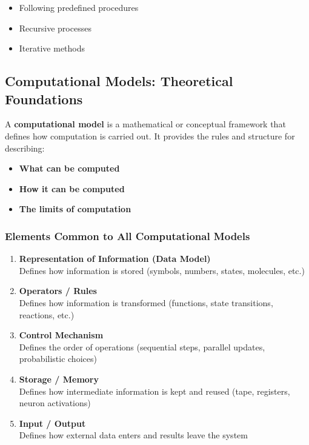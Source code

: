 \begin{itemize}
\item Following predefined procedures
\item Recursive processes
\item Iterative methods
\end{itemize}

\subsection{Computational Models: Theoretical Foundations}

A \textbf{computational model} is a mathematical or conceptual framework that defines how computation is carried out. It provides the rules and structure for describing:

\begin{itemize}
\item \textbf{What can be computed}
\item \textbf{How it can be computed}
\item \textbf{The limits of computation}
\end{itemize}

\subsubsection{Elements Common to All Computational Models}

\begin{enumerate}
\item \textbf{Representation of Information (Data Model)}\\
   Defines how information is stored (symbols, numbers, states, molecules, etc.)

\item \textbf{Operators / Rules}\\
   Defines how information is transformed (functions, state transitions, reactions, etc.)

\item \textbf{Control Mechanism}\\
   Defines the order of operations (sequential steps, parallel updates, probabilistic choices)

\item \textbf{Storage / Memory}\\
   Defines how intermediate information is kept and reused (tape, registers, neuron activations)

\item \textbf{Input / Output}\\
   Defines how external data enters and results leave the system
\end{enumerate}

